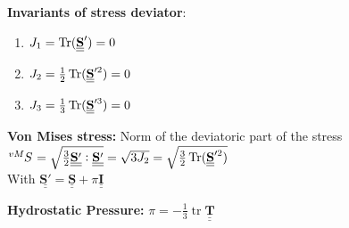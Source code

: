 \textbf{Invariants of stress deviator}: \\
\begin{enumerate}
\item $J_1 = \operatorname{Tr}({\underline{\underline{\mathbf{S}}}}') = 0$
\item $J_2 = \frac{1}{2} \operatorname{Tr}({\underline{\underline{\mathbf{S}}}}'^2) = 0$
\item $J_3 = \frac{1}{3} \operatorname{Tr}({\underline{\underline{\mathbf{S}}}}'^3) = 0$
\end{enumerate}

\textbf{Von Mises stress:} Norm of the deviatoric part of the stress \\
$\tensor[^{vM}]{S}{} = \sqrt{\frac{3}{2} \underline{\underline{\mathbf{S'}}} : \underline{\underline{\mathbf{S'}}}} = \sqrt{3 J_2} = \sqrt{\frac{3}{2} \Tr({\underline{\underline{\mathbf{S}}}}'^2)}$ \\
With $\underline{\underline{\mathbf{S'}}} = \underline{\underline{\mathbf{S}}} + \pi \underline{\underline{\mathbf{I}}}$

\textbf{Hydrostatic Pressure:} $\pi = - \frac{1}{3} \operatorname{tr}\underline{\underline{\mathbf{T}}}$